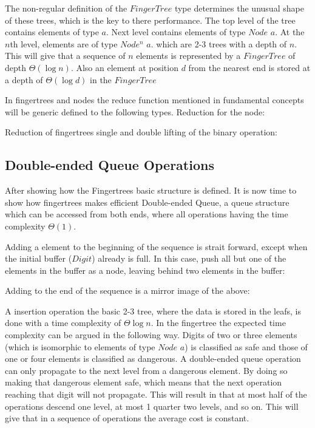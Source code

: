 The non-regular definition of the $FingerTree$ type determines the unusual shape
of these trees, which is the key to there performance. The top level of the tree
contains elements of type $a$. Next level contains elements of type $Node$ $a$.
At the $n$th level, elements are of type $Node^n$ $a$. which are 2-3 trees with
a depth of $n$. This will give that a sequence of $n$ elements is represented by
a $FingerTree$ of depth $\Theta(\log n)$. Also an element at position $d$ from
the nearest end is stored at a depth of $\Theta(\log d)$ in the $FingerTree$
\cite{fingertree}

In fingertrees and nodes the reduce function mentioned in fundamental concepts
will be generic defined to the following types. 
Reduction for the node:

Reduction of fingertrees single and double lifting of the binary operation:


\subsection{Double-ended Queue Operations}
After showing how the Fingertrees basic structure is defined. It is now time to
show how fingertrees makes efficient Double-ended Queue, a queue structure which
can be accessed from both ends, where all operations having the time complexity
$\Theta(1)$.

Adding a element to the beginning of the sequence is strait forward, except when
the initial buffer ($Digit$) already is full. In this case, push all but one of
the elements in the buffer as a node, leaving behind two elements in the buffer:

Adding to the end of the sequence is a mirror image of the above:


A insertion operation the basic 2-3 tree, where the data is stored in the leafs,
is done with a time complexity of $\Theta \log n$. In the fingertree the
expected time complexity can be argued in the following way. Digits of two or
three elements (which is isomorphic to elements of type $Node$ $a$) is
classified as safe and those of one or four elements is classified as dangerous.
A double-ended queue operation can only propagate to the next level from a
dangerous element. By doing so making that dangerous element safe, which means
that the next operation reaching that digit will not propagate. This will result
in that at most half of the operations descend one level, at most 1 quarter two
levels, and so on. This will give that in a sequence of operations the average
cost is constant.

